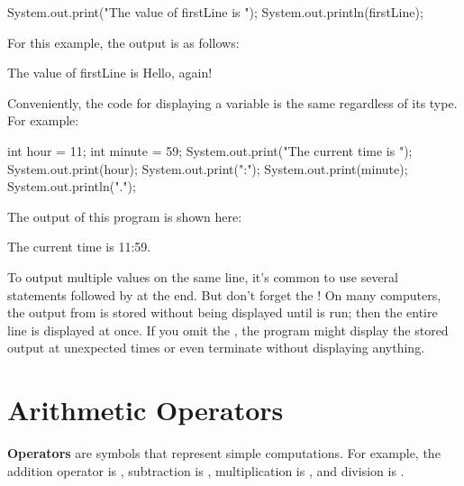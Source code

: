 \begin{code}
System.out.print("The value of firstLine is ");
System.out.println(firstLine);
\end{code}

For this example, the output is as follows:

\begin{stdout}
The value of firstLine is Hello, again!
\end{stdout}

Conveniently, the code for displaying a variable is the same regardless of its type.
For example:

\begin{code}
int hour = 11;
int minute = 59;
System.out.print("The current time is ");
System.out.print(hour);
System.out.print(":");
System.out.print(minute);
System.out.println(".");
\end{code}

The output of this program is shown here:

\begin{stdout}
The current time is 11:59.
\end{stdout}

To output multiple values on the same line, it's common to use several  statements followed by  at the end.
But don't forget the !
On many computers, the output from  is stored without being displayed until  is run; then the entire line is displayed at once.
If you omit the , the program might display the stored output at unexpected times or even terminate without displaying anything.


\section{Arithmetic Operators}



{\bf Operators} are symbols that represent simple computations.
For example, the addition operator is \java{+}, subtraction is \java{-}, multiplication is \java{*}, and division is \java{/}.

